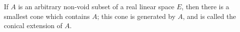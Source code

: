 If $A$ is an arbitrary non-void subset of a real linear space $E$, then there is a smallest cone which contains $A$; this cone is generated by $A$, and is called the conical extension of $A$.

